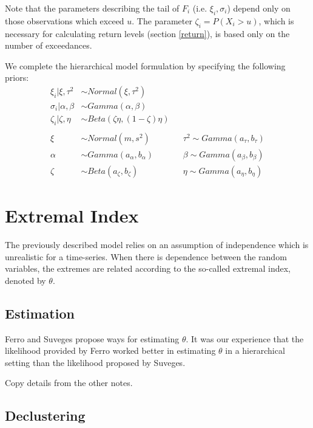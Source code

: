 \documentclass[12pt]{article}
\begin{document}
Note that the parameters describing the tail of $F_i$ (i.e. $\xi_i,\sigma_i$) depend only on those observations which exceed $u$. The parameter $\zeta_i=P(X_i>u)$, which is necessary for calculating return levels (section \ref{return}), is based only on the number of exceedances.

We complete the hierarchical model formulation by specifying the following priors:
\begin{align}
\xi_i|\xi, \tau^2  &\sim Normal(\xi, \tau^2) \nonumber \\
\sigma_i|\alpha, \beta &\sim Gamma(\alpha, \beta) \nonumber \\
\zeta_i|\zeta, \eta &\sim Beta(\zeta\eta, (1-\zeta)\eta) \nonumber \\
 \label{priors} \\
\xi &\sim Normal(m, s^2)&  &\tau^2 \sim Gamma(a_\tau, b_\tau) \nonumber \\
\alpha &\sim Gamma(a_\alpha, b_\alpha)&  &\beta \sim Gamma(a_\beta, b_\beta) \nonumber \\
\zeta &\sim Beta(a_\zeta, b_\zeta)&  &\eta \sim Gamma(a_\eta, b_\eta) \nonumber
\end{align}

\section{Extremal Index}
\label{index}

The previously described model relies on an assumption of independence which is unrealistic for a time-series. When there is dependence between the random variables, the extremes are related according to the so-called extremal index, denoted by $\theta$.

\subsection{Estimation}

Ferro and Suveges propose ways for estimating $\theta$. It was our experience that the likelihood provided by Ferro worked better in estimating $\theta$ in a hierarchical setting than the likelihood proposed by Suveges. 

Copy details from the other notes.

\subsection{Declustering}
\end{document}
